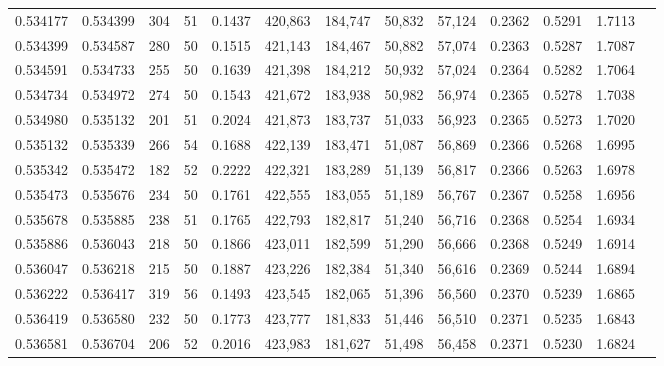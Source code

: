 \begin{tabular}{rrrrrrrrrrrrr}
0.534177 & 0.534399 &   304 &  51 &                                     0.1437 & 420,863 & 184,747 &  50,832 &  57,124 & 0.2362 & 0.5291 & 1.7113 \\
0.534399 & 0.534587 &   280 &  50 &                                     0.1515 & 421,143 & 184,467 &  50,882 &  57,074 & 0.2363 & 0.5287 & 1.7087 \\
0.534591 & 0.534733 &   255 &  50 &                                     0.1639 & 421,398 & 184,212 &  50,932 &  57,024 & 0.2364 & 0.5282 & 1.7064 \\
0.534734 & 0.534972 &   274 &  50 &                                     0.1543 & 421,672 & 183,938 &  50,982 &  56,974 & 0.2365 & 0.5278 & 1.7038 \\
0.534980 & 0.535132 &   201 &  51 &                                     0.2024 & 421,873 & 183,737 &  51,033 &  56,923 & 0.2365 & 0.5273 & 1.7020 \\
0.535132 & 0.535339 &   266 &  54 &                                     0.1688 & 422,139 & 183,471 &  51,087 &  56,869 & 0.2366 & 0.5268 & 1.6995 \\
0.535342 & 0.535472 &   182 &  52 &                                     0.2222 & 422,321 & 183,289 &  51,139 &  56,817 & 0.2366 & 0.5263 & 1.6978 \\
0.535473 & 0.535676 &   234 &  50 &                                     0.1761 & 422,555 & 183,055 &  51,189 &  56,767 & 0.2367 & 0.5258 & 1.6956 \\
0.535678 & 0.535885 &   238 &  51 &                                     0.1765 & 422,793 & 182,817 &  51,240 &  56,716 & 0.2368 & 0.5254 & 1.6934 \\
0.535886 & 0.536043 &   218 &  50 &                                     0.1866 & 423,011 & 182,599 &  51,290 &  56,666 & 0.2368 & 0.5249 & 1.6914 \\
0.536047 & 0.536218 &   215 &  50 &                                     0.1887 & 423,226 & 182,384 &  51,340 &  56,616 & 0.2369 & 0.5244 & 1.6894 \\
0.536222 & 0.536417 &   319 &  56 &                                     0.1493 & 423,545 & 182,065 &  51,396 &  56,560 & 0.2370 & 0.5239 & 1.6865 \\
0.536419 & 0.536580 &   232 &  50 &                                     0.1773 & 423,777 & 181,833 &  51,446 &  56,510 & 0.2371 & 0.5235 & 1.6843 \\
0.536581 & 0.536704 &   206 &  52 &                                     0.2016 & 423,983 & 181,627 &  51,498 &  56,458 & 0.2371 & 0.5230 & 1.6824 \\

\end{tabular}

